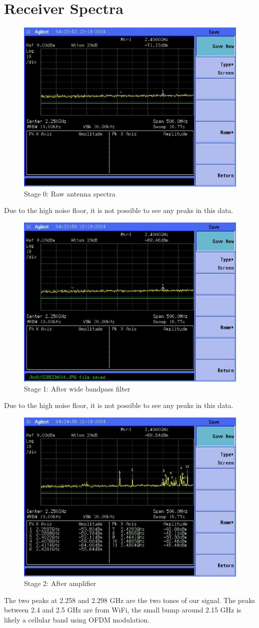 \documentclass[letterpaper,12pt]{article}
\begin{document}
\newpage
\section{Receiver Spectra}
\begin{figure}[H]
	\begin{centering}
		\includegraphics[width=0.5\columnwidth]{figures/receiver_spectra/0.beginning}
		\caption{Stage 0: Raw antenna spectra}
	\end{centering}
\end{figure}
\noindent
Due to the high noise floor, it is not possible to see any peaks in this data.
\begin{figure}[H]
	\begin{centering}
		\includegraphics[width=0.5\columnwidth]{figures/receiver_spectra/1.bpf}
		\caption{Stage 1: After wide bandpass filter}
	\end{centering}
\end{figure}
\noindent
Due to the high noise floor, it is not possible to see any peaks in this data.
\begin{figure}[H]
	\begin{centering}
		\includegraphics[width=0.5\columnwidth]{figures/receiver_spectra/2.amp}
		\caption{Stage 2: After amplifier}
	\end{centering}
\end{figure}
\noindent
The two peaks at 2.258 and 2.298 GHz are the two tones of our signal. The peaks between 2.4 and 2.5 GHz are from WiFi, the small bump around 2.15 GHz is likely a cellular band using OFDM modulation.
\end{document}
